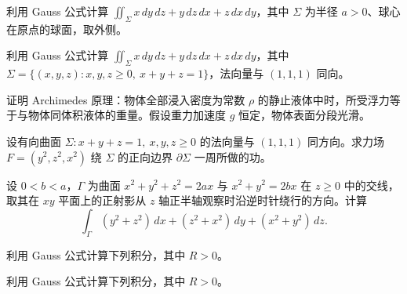 \newpage
\noindent\begin{minipage}{\textwidth}
利用 Gauss 公式计算 $\iint_\Sigma x\,dy\,dz+y\,dz\,dx+z\,dx\,dy$，其中 $\Sigma$ 为半径 $a>0$、球心在原点的球面，取外侧。
\end{minipage}\par\vfill
\noindent\begin{minipage}{\textwidth}
利用 Gauss 公式计算 $\iint_\Sigma x\,dy\,dz+y\,dz\,dx+z\,dx\,dy$，其中 $\Sigma=\{(x,y,z):x,y,z\ge0,\ x+y+z=1\}$，法向量与 $(1,1,1)$ 同向。
\end{minipage}\par\vfill
\noindent\begin{minipage}{\textwidth}
证明 Archimedes 原理：物体全部浸入密度为常数 $\rho$ 的静止液体中时，所受浮力等于与物体同体积液体的重量。假设重力加速度 $g$ 恒定，物体表面分段光滑。
\end{minipage}\par\vfill
\newpage
\noindent\begin{minipage}{\textwidth}
设有向曲面 $\Sigma:x+y+z=1,\ x,y,z\ge0$ 的法向量与 $(1,1,1)$ 同方向。求力场 $F=(y^2,z^2,x^2)$ 绕 $\Sigma$ 的正向边界 $\partial\Sigma$ 一周所做的功。
\end{minipage}\par\vfill
\noindent\begin{minipage}{\textwidth}
设 $0<b<a$，$\Gamma$ 为曲面 $x^2+y^2+z^2=2ax$ 与 $x^2+y^2=2bx$ 在 $z\ge0$ 中的交线，取其在 $xy$ 平面上的正射影从 $z$ 轴正半轴观察时沿逆时针绕行的方向。计算\[\int_\Gamma(y^2+z^2)\,dx+(z^2+x^2)\,dy+(x^2+y^2)\,dz.\]
\end{minipage}\par\vfill
\noindent\begin{minipage}{\textwidth}
利用 Gauss 公式计算下列积分，其中 $R>0$。
\end{minipage}\par\vfill
\newpage
\noindent\begin{minipage}{\textwidth}
利用 Gauss 公式计算下列积分，其中 $R>0$。
\end{minipage}\par\vfill
